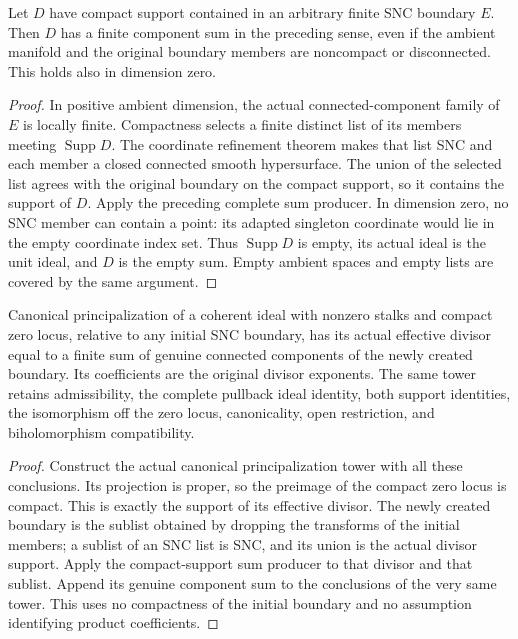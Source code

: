 \begin{theorem}
\label{hir:compact-supported-complete-divisor-sum}
\leanok
Let $D$ have compact support contained in an arbitrary finite SNC boundary
$E$. Then $D$ has a finite component sum in the preceding sense, even if
the ambient manifold and the original boundary members are noncompact or
disconnected. This holds also in dimension zero.
\end{theorem}
\begin{proof}
In positive ambient dimension, the actual connected-component family of $E$
is locally finite. Compactness selects a finite distinct list of its members
meeting $\operatorname{Supp}D$. The coordinate refinement theorem makes that
list SNC and each member a closed connected smooth hypersurface. The union
of the selected list agrees with the original boundary on the compact
support, so it contains the support of $D$. Apply the preceding complete
sum producer. In dimension zero, no SNC member can contain a point: its
adapted singleton coordinate would lie in the empty coordinate index set.
Thus $\operatorname{Supp}D$ is empty, its actual ideal is the unit ideal,
and $D$ is the empty sum. Empty ambient spaces and empty lists are covered
by the same argument.
\end{proof}

\begin{theorem}
\label{hir:canonical-principalization-complete-divisor-sum}
\leanok
Canonical principalization of a coherent ideal with nonzero stalks and
compact zero locus, relative to any initial SNC boundary, has its actual
effective divisor equal to a finite sum of genuine connected components
of the newly created boundary. Its coefficients are the original divisor
exponents. The same tower retains admissibility, the complete pullback ideal
identity, both support identities, the isomorphism off the zero locus,
canonicality, open restriction, and biholomorphism compatibility.
\end{theorem}
\begin{proof}
Construct the actual canonical principalization tower with all these
conclusions. Its projection is proper, so the preimage of the compact zero
locus is compact. This is exactly the support of its effective divisor.
The newly created boundary is the sublist obtained by dropping the
transforms of the initial members; a sublist of an SNC list is SNC, and
its union is the actual divisor support. Apply the compact-support sum
producer to that divisor and that sublist. Append its genuine component
sum to the conclusions of the very same tower. This uses no compactness
of the initial boundary and no assumption identifying product coefficients.
\end{proof}
